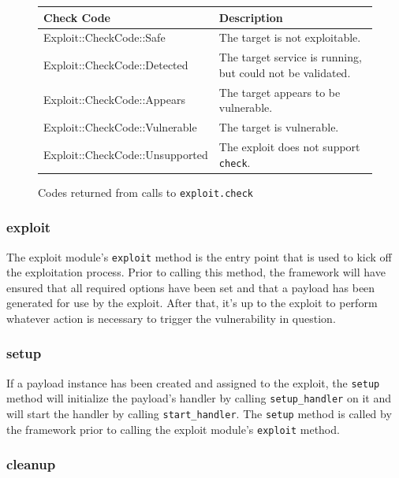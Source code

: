 \documentclass{report}
\begin{document}
\begin{figure}[h]
\begin{center}
\begin{tabular}{|l|p{2.5in}|}
\hline
\textbf{Check Code} & \textbf{Description} \\
\hline
Exploit::CheckCode::Safe & The target is not exploitable. \\
Exploit::CheckCode::Detected & The target service is running, but could not be validated. \\
Exploit::CheckCode::Appears & The target appears to be vulnerable. \\
Exploit::CheckCode::Vulnerable & The target is vulnerable. \\
Exploit::CheckCode::Unsupported & The exploit does not support \texttt{check}. \\
\hline
\end{tabular}
\caption{Codes returned from calls to \texttt{exploit.check}}
\label{fig-table-exploit-checkcodes}
\end{center}
\end{figure}


            \subsubsection{exploit}

\par
The exploit module's \texttt{exploit} method is the entry point that
is used to kick off the exploitation process.  Prior to calling this
method, the framework will have ensured that all required options
have been set and that a payload has been generated for use by the
exploit.  After that, it's up to the exploit to perform whatever
action is necessary to trigger the vulnerability in question.

            \subsubsection{setup}

\par
If a payload instance has been created and assigned to the exploit,
the \texttt{setup} method will initialize the payload's handler by
calling \texttt{setup\_handler} on it and will start the handler by
calling \texttt{start\_handler}.  The \texttt{setup} method is
called by the framework prior to calling the exploit module's
\texttt{exploit} method.

            \subsubsection{cleanup}
\end{document}
